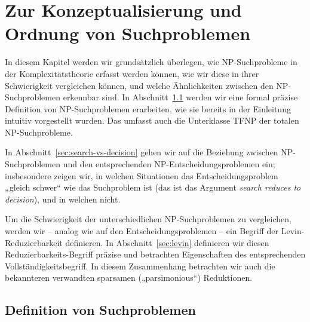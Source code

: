 \chapter{Zur Konzeptualisierung und Ordnung von Suchproblemen}\label{chap:searchproblems}

In diesem Kapitel werden wir grundsätzlich überlegen, wie NP-Suchprobleme in der Komplexitätstheorie erfasst werden können, wie wir diese in ihrer Schwierigkeit vergleichen können, und welche Ähnlichkeiten zwischen den NP-Suchproblemen erkennbar sind. 
In Abschnitt~\ref{sec:searchproblems-def} werden wir eine formal präzise Definition von NP-Suchproblemen erarbeiten, wie sie bereits in der Einleitung intuitiv vorgestellt wurden. Das umfasst auch die Unterklasse TFNP der totalen NP-Suchprobleme.

In Abschnitt~\ref{sec:search-vs-decision} gehen wir auf die Beziehung zwischen NP-Suchproblemen und den entsprechenden NP-Entscheidungsproblemen ein; insbesondere zeigen wir, in welchen Situationen das Entscheidungsproblem „gleich schwer“ wie das Suchproblem ist (das ist das Argument \emph{search reduces to decision}), und in welchen nicht.

Um die Schwierigkeit der unterschiedlichen NP-Suchproblemen zu vergleichen, werden wir – analog wie auf den Entscheidungsproblemen – ein Begriff der Levin-Reduzierbarkeit definieren. In Abschnitt~\ref{sec:levin} definieren wir diesen Reduzierbarkeits-Begriff präzise und betrachten Eigenschaften des entsprechenden Vollständigkeitsbegriff.
In diesem Zusammenhang betrachten wir auch die bekannteren verwandten sparsamen („parsimonious“) Reduktionen.

\section{Definition von Suchproblemen}\label{sec:searchproblems-def}

